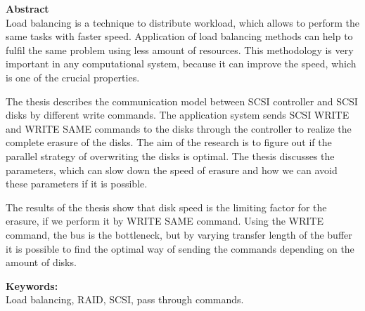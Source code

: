 {\bf Abstract}\\


Load balancing is a technique to distribute workload, which allows to perform the same tasks with faster speed. Application of load balancing methods can help to fulfil the same problem using less amount of resources. This methodology is very important in any computational system, because it can improve the speed, which is one of the crucial properties. 

The thesis describes the communication model between SCSI controller and SCSI disks by different write commands. The application system sends SCSI WRITE and WRITE SAME commands to the disks through the controller to realize the complete erasure of the disks. The aim of the research is to figure out if the parallel strategy of overwriting the disks is optimal. The thesis discusses the parameters, which can slow down the speed of erasure and how we can avoid these parameters if it is possible.

The results of the thesis show that disk speed is the limiting factor for the erasure, if we perform it by WRITE SAME command. Using the WRITE command, the bus is the bottleneck, but by varying transfer length of the buffer it is possible to find the optimal way of sending the commands depending on the amount of disks.





{\bf Keywords:}\\
Load balancing, RAID, SCSI, pass through commands.
